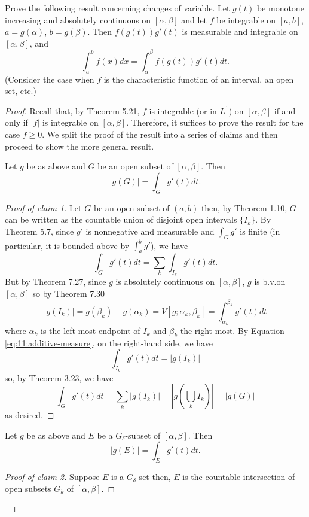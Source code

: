 
\begin{problem}
Prove the following result concerning changes of variable. Let $g(t)$ be
monotone increasing and absolutely continuous on $[\alpha,\beta]$ and let $f$
be integrable on $[a,b]$, $a= g(\alpha)$, $b=
g(\beta)$. Then $f(g(t))g'(t)$ is measurable and integrable on
$[\alpha,\beta]$, and
\[
\int_a^b f(x)d x=\int_\alpha^\beta f(g(t))g'(t)d t.
\]
(Consider the case when $f$ is the characteristic function of an interval,
an open set, etc.)
\end{problem}
\begin{proof}
Recall that, by Theorem 5.21, $f$ is integrable (or in $L^1$) on
$[\alpha,\beta]$ if and only if $|f|$ is integrable on
$[\alpha,\beta]$. Therefore, it suffices to prove the result for the case
$f\geq 0$. We split the proof of the result into a series of claims and
then proceed to show the more general result.
\begin{claim}
Let $g$ be as above and $G$ be an open subset of $[\alpha,\beta]$. Then
\[
|g(G)|=\int_G g'(t)dt.
\]
\end{claim}
\begin{proof}[Proof of claim 1]
\renewcommand\qedsymbol{$\clubsuit$}
Let $G$ be an open subset of $(a,b)$ then, by Theorem 1.10, $G$ can be
written as the countable union of disjoint open intervals $\{I_k\}$. By
Theorem 5.7, since $g'$ is nonnegative and measurable and
$\int_Gg'$ is finite (in particular, it is bounded above by $\int_a^bg'$),
we have
\begin{equation}
\label{eq:11:additive-measure}
\int_Gg'(t)dt=\sum_k\int_{I_k}g'(t)dt.
\end{equation}
But by Theorem 7.27, since $g$ is absolutely continuous on
$[\alpha,\beta]$, $g$ is b.v.\@ on $[\alpha,\beta]$ so by Theorem 7.30
\[
|g(I_k)|
=g(\beta_k)-g(\alpha_k)
=V[g;\alpha_k,\beta_k]
=\int_{\alpha_k}^{\beta_k}g'(t)dt
\]
where $\alpha_k$ is the left-most endpoint of $I_k$ and $\beta_k$ the
right-most. By Equation \eqref{eq:11:additive-measure}, on the right-hand
side, we have
\[
\int_{I_k}g'(t)dt=|g(I_k)|
\]
so, by Theorem 3.23, we have
\begin{equation}
\label{eq:11:measure-sum-integral-dev}
\int_G g'(t)dt
=\sum_k|g(I_k)|
=\left|g\left({\textstyle\bigcup_k I_k}\right)\right|
=|g(G)|
\end{equation}
as desired.
\end{proof}
\begin{claim}
Let $g$ be as above and $E$ be a $G_\delta$-subset of
$[\alpha,\beta]$. Then
\[
|g(E)|=\int_E g'(t)dt.
\]
\end{claim}
\begin{proof}[Proof of claim 2]
\renewcommand\qedsymbol{$\clubsuit$}
Suppose $E$ is a $G_\delta$-set then, $E$ is the countable intersection of
open subsets $G_k$ of $[\alpha,\beta]$.
\end{proof}
\end{proof}
\newpage

